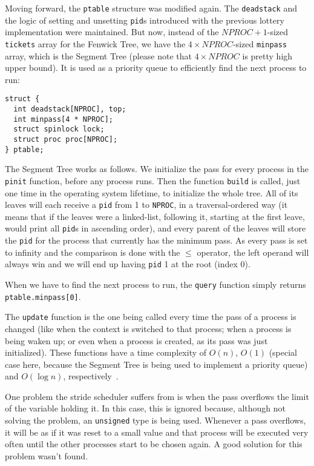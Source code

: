 \documentclass[12pt]{article}
\begin{document}
Moving forward, the \texttt{ptable} structure was modified again. The \texttt{deadstack} and the logic of setting and unsetting \texttt{pid}s introduced with the previous lottery implementation were maintained. But now, instead of the $NPROC + 1$-sized \texttt{tickets} array for the Fenwick Tree, we have the $4 \times NPROC$-sized \texttt{minpass} array, which is the Segment Tree (please note that $4 \times NPROC$ is pretty high upper bound). It is used as a priority queue to efficiently find the next process to run:

\begin{scriptsize}
\begin{verbatim}
struct {
  int deadstack[NPROC], top;
  int minpass[4 * NPROC];
  struct spinlock lock;
  struct proc proc[NPROC];
} ptable;
\end{verbatim}
\end{scriptsize}

The Segment Tree works as follows. We initialize the pass for every process in the \texttt{pinit} function, before any process runs. Then the function \texttt{build} is called, just one time in the operating system lifetime, to initialize the whole tree. All of its leaves will each receive a \texttt{pid} from 1 to \texttt{NPROC}, in a traversal-ordered way (it means that if the leaves were a linked-list, following it, starting at the first leave, would print all \texttt{pid}s in ascending order), and every parent of the leaves will store the \texttt{pid} for the process that currently has the minimum pass. As every pass is set to infinity and the comparison is done with the $\le$ operator, the left operand will always win and we will end up having \texttt{pid} 1 at the root (index 0).

When we have to find the next process to run, the \texttt{query} function simply returns \texttt{ptable.minpass[0]}.

The \texttt{update} function is the one being called every time the pass of a process is changed (like when the context is switched to that process; when a process is being waken up; or even when a process is created, as its pass was just initialized). These functions have a time complexity of $O(n)$, $O(1)$ (special case here, because the Segment Tree is being used to implement a priority queue) and $O(\log n)$, respectively~\cite{halim:13}.

One problem the stride scheduler suffers from is when the pass overflows the limit of the variable holding it. In this case, this is ignored because, although not solving the problem, an \texttt{unsigned} type is being used. Whenever a pass overflows, it will be as if it was reset to a small value and that process will be executed very often until the other processes start to be chosen again. A good solution for this problem wasn't found.
\end{document}
